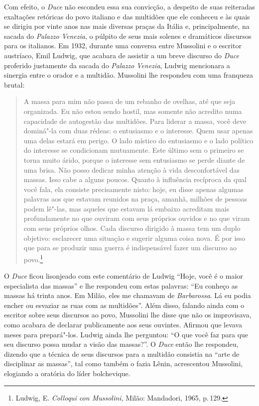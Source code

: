Com efeito, o \emph{Duce} não escondeu essa sua convicção, a despeito de
suas reiteradas exaltações retóricas do povo italiano e das multidões
que ele conheceu e às quais se dirigiu por vinte anos nas mais diversas
praças da Itália e, principalmente, na sacada do \emph{Palazzo Venezia},
o púlpito de seus mais solenes e dramáticos discursos para os italianos.
Em 1932, durante uma conversa entre Mussolini e o escritor austríaco,
Emil Ludwig, que acabara de assistir a um breve discurso do \emph{Duce}
proferido justamente da sacada do \emph{Palazzo Venezia}, Ludwig
mencionara a sinergia entre o orador e a multidão. Mussolini lhe
respondeu com uma franqueza brutal:

\begin{quote}
A massa para mim não passa de um rebanho de ovelhas, até que seja
organizada. Eu não estou sendo hostil, mas somente não acredito numa
capacidade de autogestão das multidões. Para liderar a massa, você deve
dominá"-la com duas rédeas: o entusiasmo e o interesse. Quem usar apenas
uma delas estará em perigo. O lado místico do entusiasmo e o lado
político do interesse se condicionam mutuamente. Este último sem o
primeiro se torna muito árido, porque o interesse sem entusiasmo se
perde diante de uma brisa. Não posso dedicar minha atenção à vida
desconfortável das massas. Isso cabe a alguns poucos. Quanto à
influência recíproca da qual você fala, ela consiste precisamente nisto:
hoje, eu disse apenas algumas palavras aos que estavam reunidos na
praça, amanhã, milhões de pessoas podem lê"-las, mas aqueles que estavam
lá embaixo acreditam mais profundamente no que ouviram com seus próprios
ouvidos e no que viram com seus próprios olhos. Cada discurso dirigido à
massa tem um duplo objetivo: esclarecer uma situação e sugerir alguma
coisa nova. É por isso que para se produzir uma guerra é indispensável
fazer um discurso ao povo.\footnote{Ludwig, E. \emph{Colloqui con
  Mussolini,} Milão: Mandadori, 1965, p.\,129.}
\end{quote}

O \emph{Duce} ficou lisonjeado com este comentário de Ludwig ``Hoje, você
é o maior especialista das massas'' e lhe respondeu com estas palavras:
``Eu conheço as massas há trinta anos. Em Milão, eles me chamavam de
\emph{Barbarossa}. Lá eu podia encher ou esvaziar as ruas com as
multidões''. Além disso, falando ainda com o escritor sobre seus
discursos ao povo, Mussolini lhe disse que não os improvisava, como
acabara de declarar publicamente aos seus ouvintes. Afirmou que levava
meses para prepará"-los. Ludwig ainda lhe perguntou: ``O que você faz para
que seu discurso possa mudar a visão das massas?''. O \emph{Duce} então
lhe respondeu, dizendo que a técnica de seus discursos para a multidão
consistia na ``arte de disciplinar as massas'', tal como também o fazia
Lênin, acrescentou Mussolini, elogiando a oratória do líder bolchevique.

